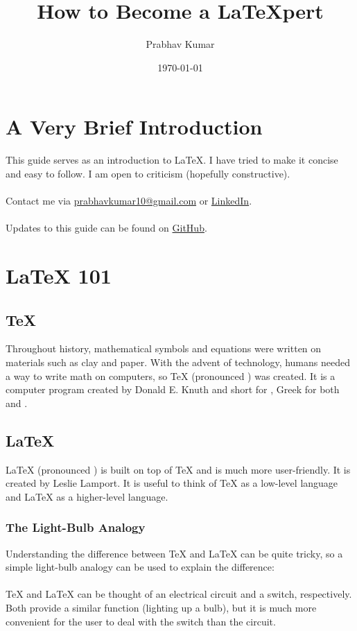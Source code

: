 \documentclass[12pt]{report}
\title{How to Become a \LaTeX pert}
\author{\color{deepjunglegreen}Prabhav Kumar}
\date{\color{deepjunglegreen}\today}
\theoremstyle{dotless}
\begin{document}
\maketitle

\tableofcontents

\setcounter{page}{6}

\chapter{A Very Brief Introduction}
This guide serves as an introduction to \LaTeX{}. I have tried to make it concise and easy to follow. I am open to criticism (hopefully constructive). \\\\ Contact me via \url{prabhavkumar10@gmail.com} or \href{https://www.linkedin.com/in/prabhavkumar/}{LinkedIn}. \\\\ Updates to this guide can be found on \href{https://github.com/Prabhav10/LaTeX}{GitHub}.


\chapter{\LaTeX{} 101}

\section{\TeX{}}
Throughout history, mathematical symbols and equations were written on materials such as clay and paper. With the advent of technology, humans needed a way to write math on computers, so \TeX{} (pronounced ) was created. It is a computer program created by Donald E. Knuth and short for {}, Greek for both  and .

\section{\LaTeX{}}
\LaTeX{} (pronounced ) is built on top of \TeX{} and is much more user-friendly. It is created by Leslie Lamport. It is useful to think of \TeX{} as a low-level language and \LaTeX{} as a higher-level language. 

\subsection{The Light-Bulb Analogy}
Understanding the difference between \TeX{} and \LaTeX{} can be quite tricky, so a simple light-bulb analogy can be used to explain the difference: \\\\ \TeX{} and \LaTeX{} can be thought of an electrical circuit and a switch, respectively. Both provide a similar function (lighting up a bulb), but it is much more convenient for the user to deal with the switch than the circuit.
\end{document}
